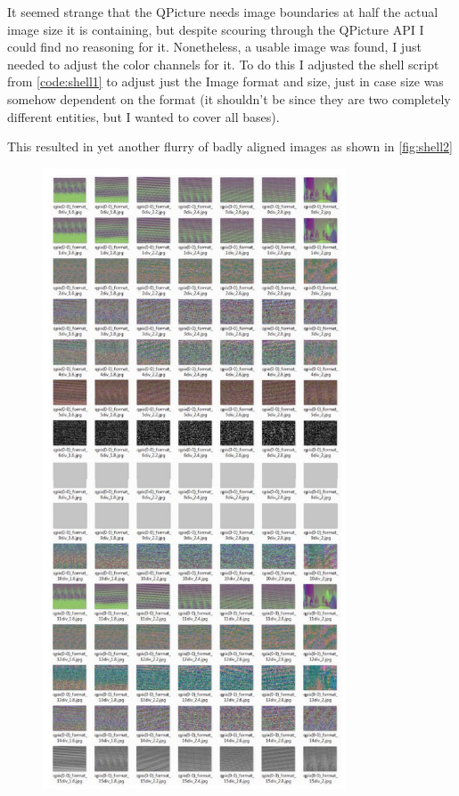 \documentclass[11pt]{article} %
\begin{document}
{{It seemed strange that the QPicture needs image boundaries at half the actual image size it is containing, but despite scouring through the QPicture API I could find no reasoning for it. Nonetheless, a usable image was found, I just needed to adjust the color channels for it.
To do this I adjusted the shell script from \cref{code:shell1} to adjust just the Image format and size, just in case size was somehow dependent on the format (it shouldn’t be since they are two completely different entities, but I wanted to cover all bases).
\begin{frame}{}
	\vspace{10pt}
	
	\vspace{10pt}
\end{frame}
This resulted in yet another flurry of badly aligned images as shown in \cref{fig:shell2}
\begin{figure}
	\begin{center}
		\includegraphics[width=0.8\textwidth]{../images/qpix/shell2}

\end{center}
\end{figure}}}
\end{document}
